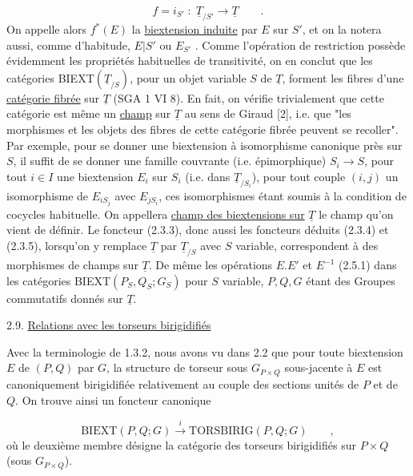 \begin{equation*}
f = i_{S'} \; : \; \underline{T}_{/S'} \longrightarrow \underline{T} \qquad .
\end{equation*}
On appelle alors $f^{*}(E)$ la \underline{biextension induite} par $E$ sur $S'$, et on la notera aussi, comme d'habitude, $E|S'$ ou $E_{S'}$ . Comme l'opération de restriction possède évidemment les propriétés habituelles de transitivité, on en conclut que les catégories BIEXT$(\underline{T}_{/S})$, pour un objet variable $S$ de $\underline{T}$, forment les fibres d'une \underline{catégorie fibrée} sur $\underline{T}$ (SGA 1 VI 8). En fait, on vérifie trivialement que cette catégorie est même un \underline{champ} sur $\underline{T}$ au sens de Giraud [2], i.e. que "les morphismes et les objets des fibres de cette catégorie fibrée peuvent se recoller". Par exemple, pour se donner une biextension à isomorphisme canonique près sur $S$, il suffit de se donner une famille couvrante (i.e. épimorphique) $S_i \longrightarrow S$, pour tout $i \in I$ une biextension $E_i$ sur $S_i$ (i.e. dans $\underline{T}_{/S_i}$), pour tout couple $(i,j)$ un isomorphisme de $E_{iS_j}$ avec $E_{jS_i}$, ces isomorphismes étant soumis à la condition de cocycles habituelle. On appellera \underline{champ des biextensions sur} $\underline{T}$ le champ qu'on vient de définir. Le foncteur (2.3.3), donc aussi les foncteurs déduits (2.3.4) et (2.3.5), lorsqu'on y remplace $\underline{T}$ par $\underline{T}_{/S}$ avec $S$ variable, correspondent à des morphismes de champs sur $\underline{T}$. De même les opérations $E.E'$ et $E^{-1}$ (2.5.1) dans les catégories BIEXT$(P_S,Q_S;G_S)$ pour $S$ variable, $P,Q,G$ étant des Groupes commutatifs donnés sur $\underline{T}$.






2.9. \underline{Relations avec les torseurs birigidifiés}

Avec la terminologie de 1.3.2, nous avons vu dans 2.2 que pour toute biextension $E$ de $(P,Q)$ par $G$, la structure de torseur sous $G_{P\times Q}$ sous-jacente à $E$ est canoniquement birigidifiée relativement au couple des sections unités de $P$ et de $Q$. On trouve ainsi un foncteur canonique

\begin{equation}\tag{2.9.1}
\mathrm{BIEXT}(P,Q;G) \xrightarrow{\;i\;} \mathrm{TORSBIRIG}(P,Q;G) \qquad ,
\end{equation}
où le deuxième membre désigne la catégorie des torseurs birigidifiés sur $P\times Q$ (sous $G_{P\times Q}$).

